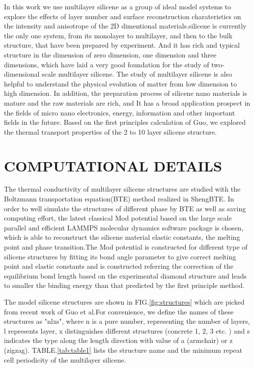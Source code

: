 \documentclass[%
 reprint,
 amsmath,amssymb,
 aps,
 prb,
]{revtex4-1}
\begin{document}
In this work we use multilayer silicene as a group of  ideal model systems to explore the effects of layer number and  surface reconstruction charateristics on the intensity and anisotrope of the 2D dimentional materials.silicene  is currently the only one system, from its monolayer to multilayer, and then to the bulk structure, that have been prepared by experiment. And it has rich and typical structure in the dimension of zero dimension, one dimension and three dimensions, which have laid a very good foundation for the study of two-dimensional scale multilayer silicene. The study of multilayer silicene is also helpful to understand the physical evolution of matter from low dimension to high dimension. In addition, the preparation process of silicene nano materials is mature and the raw materials are rich, and It has a broad application prospect in the fields of micro nano electronics, energy, information and other important fields in the future. Based on the first principles calculation of Guo\cite{Guo2015Structural}, we explored the thermal transport properties of the 2 to 10 layer silicene structure.


\section{COMPUTATIONAL DETAILS}

The thermal conductivity of multilayer silicene structures are studied with the Boltzmann transportation equation(BTE) method realized in ShengBTE\cite{Li2014}. In order to well simulate the structures of different phase by BTE as well as saving computing effort, the latest classical Mod potential\cite{Parks2007} based on the large scale parallel and efficient LAMMPS molecular dynamics software package is chosen\cite{Kumagai2007Development}, which is able to reconstruct the silicene material elastic constants, the melting point and phase transition.The Mod potential is constructed for different type of silicene structures by fitting its bond angle parameter to give correct melting point and elastic constants and is constructed referring the correction of the equilibrium bond length based on the experimental diamond structure and leads to smaller the binding energy than that predicted by the first principle method.

The model silicene structures are shown in FIG.\ref{fig:structures} which are picked from recent work of Guo et al\cite{Guo2015Structural}.For convenience, we define the names of these structures as "nlxs", where n is a pure number, representing the number of layers, l represents layer, x distinguishes different structures (concrete 1, 2, 3 etc. ) and s indicates the type along the length direction with value of a (armchair) or z (zigzag). TABLE.\ref{tab:table1} lists the structure name and  the minimum repeat cell periodicity of the multilayer silicene.
\end{document}
